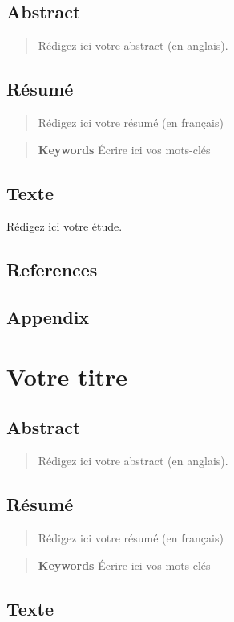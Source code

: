 \documentclass[12pt]{ulaval}
\begin{document}
\hypertarget{abstract}{%
\section{Abstract}\label{abstract}}
\begin{quote}
Rédigez ici votre abstract (en anglais).
\end{quote}
\hypertarget{ruxe9sumuxe9}{%
\section{Résumé}\label{ruxe9sumuxe9}}
\begin{quote}
Rédigez ici votre résumé (en français)
\end{quote}
\begin{quote}
\textbf{Keywords}
Écrire ici vos mots-clés
\end{quote}
\hypertarget{texte}{%
\section{Texte}\label{texte}}

Rédigez ici votre étude.

\hypertarget{references}{%
\section{References}\label{references}}

\hypertarget{appendix}{%
\section{Appendix}\label{appendix}}

\hypertarget{votre-titre-1}{%
\chapter{Votre titre}\label{votre-titre-1}}

\hypertarget{abstract-1}{%
\section{Abstract}\label{abstract-1}}
\begin{quote}
Rédigez ici votre abstract (en anglais).
\end{quote}
\hypertarget{ruxe9sumuxe9-1}{%
\section{Résumé}\label{ruxe9sumuxe9-1}}
\begin{quote}
Rédigez ici votre résumé (en français)
\end{quote}
\begin{quote}
\textbf{Keywords}
Écrire ici vos mots-clés
\end{quote}
\hypertarget{texte-1}{%
\section{Texte}\label{texte-1}}
\end{document}
